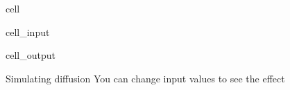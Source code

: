 \documentclass[letterpaper,10pt,english]{jupyterBook}
\begin{document}
\begin{sphinxuseclass}{cell}
\begin{sphinxVerbatimInput}
\begin{sphinxuseclass}{cell_input}
\begin{sphinxVerbatim}[commandchars=\\\{\}]
       
     
\end{sphinxVerbatim}

\end{sphinxuseclass}\end{sphinxVerbatimInput}
\begin{sphinxVerbatimOutput}

\begin{sphinxuseclass}{cell_output}
\begin{sphinxVerbatim}[commandchars=\\\{\}]
Simulating diffusion 
You can change input values to see the effect
\end{sphinxVerbatim}

\noindent{}

\end{sphinxuseclass}\end{sphinxVerbatimOutput}

\end{sphinxuseclass}
\end{document}
